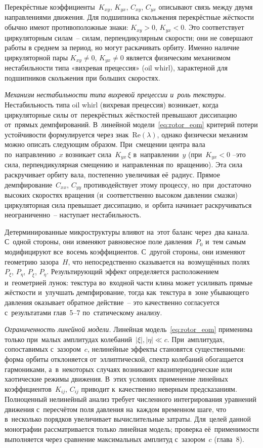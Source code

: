 Перекрёстные коэффициенты~$K_{xy}$, $K_{yx}$, $C_{xy}$,
$C_{yx}$ описывают связь между двумя направлениями движения.
Для подшипника скольжения перекрёстные жёсткости обычно имеют
противоположные знаки: $K_{xy} > 0$, $K_{yx} < 0$. Это
соответствует циркуляторным силам~-- силам, перпендикулярным
скорости; они не совершают работы в среднем за период,
но могут раскачивать орбиту. Именно наличие циркуляторной пары
$K_{xy} \neq 0$, $K_{yx} \neq 0$ является физическим
механизмом нестабильности типа «вихревая прецессия»
(oil whirl), характерной для подшипников скольжения при
больших скоростях.

\textit{Механизм нестабильности типа вихревой прецессии и~роль текстуры.}
Нестабильность типа oil whirl (вихревая прецессия) возникает, когда циркуляторные силы от~перекрёстных жёсткостей превышают диссипацию от~прямых демпфирований. В~линейной модели~\eqref{eq:rotor_eom} критерий потери устойчивости формулируется через знак~$\mathrm{Re}(\lambda)$, однако физически механизм можно описать следующим образом. При~смещении центра вала по~направлению~$x$ возникает сила~$K_{yx}\,\xi$ в~направлении~$y$ (при~$K_{yx} < 0$ --это сила, перпендикулярная смещению и~направленная по~вращению). Эта сила раскручивает орбиту вала, постепенно увеличивая её~радиус. Прямое демпфирование~$C_{xx}$, $C_{yy}$ противодействует этому процессу, но~при~достаточно высоких скоростях вращения (и~соответственно высоком давлении смазки) циркуляторная сила превышает диссипацию, и~орбита начинает раскручиваться неограниченно~-- наступает нестабильность.

Детерминированные микроструктуры влияют на~этот баланс через~два канала. С~одной стороны, они изменяют равновесное поле давления~$P_0$ и~тем самым модифицируют все~восемь коэффициентов. С~другой стороны, они изменяют геометрию зазора~$H$, что непосредственно сказывается на~возмущённых полях~$P_\xi$, $P_\eta$, $P_{\dot\xi}$, $P_{\dot\eta}$. Результирующий эффект определяется расположением и~геометрией лунок: текстура во~входной части клина может усиливать прямые жёсткости и~улучшать демпфирование, тогда как~текстура в~зоне убывающего давления оказывает обратное действие~-- это качественно согласуется с~результатами глав~5--7 по~статическому анализу.

\textit{Ограниченность линейной модели.}
Линейная модель~\eqref{eq:rotor_eom} применима только при~малых амплитудах колебаний~$|\xi|, |\eta| \ll c$. При~амплитудах, сопоставимых с~зазором~$c$, нелинейные эффекты становятся существенными: форма орбиты отклоняется от~эллиптической, спектр колебаний обогащается гармониками, а~в~некоторых случаях возникают квазипериодические или хаотические режимы движения. В~этих условиях применение линейных коэффициентов~$K_{ij}$, $C_{ij}$ приводит к~качественно неверным предсказаниям. Полноценный нелинейный анализ требует численного интегрирования уравнений движения с~пересчётом поля давления на~каждом временном шаге, что в~несколько порядков увеличивает вычислительные затраты. Для~целей данной монографии рассматривается только линейная модель; проверка её~применимости выполняется через сравнение максимальных амплитуд с~зазором~$c$ (глава~8).

